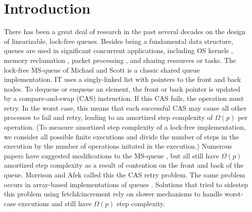 
\section{Introduction}

There has been a great deal of research in the past several decades on the design of linearizable, lock-free queues.
Besides being a fundamental data structure, queues are used in
significant concurrent applications, including OS kernels \cite{MP91}, memory reclamation \cite{?},
packet processing \cite{DPDK},
and sharing resources or tasks.
The lock-free MS-queue of Michael and Scott \cite{MS98} is a classic shared queue implementation.
IT uses a singly-linked list with pointers to the front and back nodes.
To dequeue or enqueue an element, the front or back pointer is updated by a 
compare-and-swap (CAS) instruction.
If this CAS fails, the operation must retry.
In the worst case, this means that each successful CAS may cause all other processes to
fail and retry, leading to an amortized step complexity of $\Omega(p)$ per operation.
(To measure amortized step complexity of a lock-free implementation, we consider all possible finite executions
and divide the number of steps in the execution by the number of operations initated in the execution.)
Numerous papers have suggested modifications to the MS-queue \cite{DBLP:conf/opodis/HoffmanSS07,DBLP:conf/podc/KoganH14,DBLP:conf/ppopp/KoganP11,DBLP:journals/dc/Ladan-MozesS08,MKLLP22,DBLP:conf/spaa/MoirNSS05,RC17}, but 
all still have $\Omega(p)$ amortized step complexity as a result of
contention on the front and back of the queue.
Morrison and Afek \cite{DBLP:conf/ppopp/MorrisonA13} called this the CAS retry problem.
The same problem occurs in array-based implementations of queues \cite{DBLP:conf/iceccs/ColvinG05,DBLP:conf/icdcn/Shafiei09,DBLP:conf/spaa/TsigasZ01,DBLP:conf/opodis/GidenstamST10}.
Solutions that tried to sidestep this problem using fetch\&increment \cite{DBLP:conf/ppopp/MorrisonA13,DBLP:conf/ppopp/YangM16,Nik19,10.1145/3490148.3538572}
rely on slower mechanisms to handle worst-case executions and still have $\Omega(p)$ step complexity.

